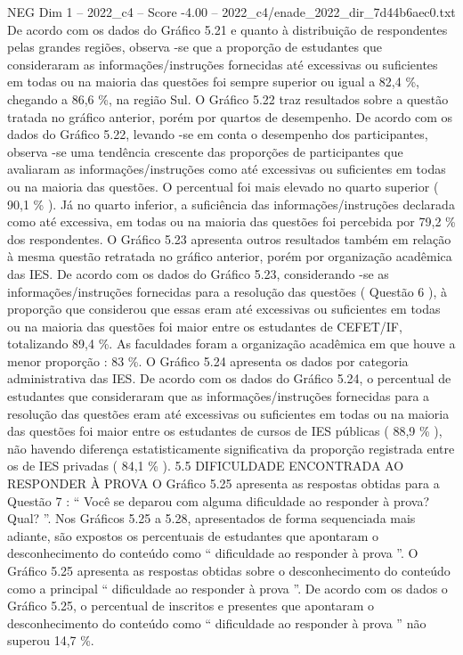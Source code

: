 \begin{textsample}{NEG Dim 1 – 2022\_c4 – Score -4.00 – 2022\_c4/enade\_2022\_dir\_7d44b6aec0.txt}
De acordo com os dados do Gráfico 5.21 e quanto à distribuição de respondentes pelas grandes regiões, observa -se que a proporção de estudantes que consideraram as informações/instruções fornecidas até excessivas ou suficientes em todas ou na maioria das questões foi sempre superior ou igual a 82,4 \%, chegando a 86,6 \%, na região Sul.
O Gráfico 5.22 traz resultados sobre a questão tratada no gráfico anterior, porém por quartos de desempenho.
De acordo com os dados do Gráfico 5.22, levando -se em conta o desempenho dos participantes, observa -se uma tendência crescente das proporções de participantes que avaliaram as informações/instruções como até excessivas ou suficientes em todas ou na maioria das questões.
O percentual foi mais elevado no quarto superior ( 90,1 \% ).
Já no quarto inferior, a suficiência das informações/instruções declarada como até excessiva, em todas ou na maioria das questões foi percebida por 79,2 \% dos respondentes.
O Gráfico 5.23 apresenta outros resultados também em relação à mesma questão retratada no gráfico anterior, porém por organização acadêmica das IES.
De acordo com os dados do Gráfico 5.23, considerando -se as informações/instruções fornecidas para a resolução das questões ( Questão 6 ), à proporção que considerou que essas eram até excessivas ou suficientes em todas ou na maioria das questões foi maior entre os estudantes de CEFET/IF, totalizando 89,4 \%.
As faculdades foram a organização acadêmica em que houve a menor proporção : 83 \%.
O Gráfico 5.24 apresenta os dados por categoria administrativa das IES.
De acordo com os dados do Gráfico 5.24, o percentual de estudantes que consideraram que as informações/instruções fornecidas para a resolução das questões eram até excessivas ou suficientes em todas ou na maioria das questões foi maior entre os estudantes de cursos de IES públicas ( 88,9 \% ), não havendo diferença estatisticamente significativa da proporção registrada entre os de IES privadas ( 84,1 \% ). 5.5 DIFICULDADE ENCONTRADA AO RESPONDER À PROVA O Gráfico 5.25 apresenta as respostas obtidas para a Questão 7 : “ Você se deparou com alguma dificuldade ao responder à prova?
Qual? ”.
Nos Gráficos 5.25 a 5.28, apresentados de forma sequenciada mais adiante, são expostos os percentuais de estudantes que apontaram o desconhecimento do conteúdo como “ dificuldade ao responder à prova ”.
O Gráfico 5.25 apresenta as respostas obtidas sobre o desconhecimento do conteúdo como a principal “ dificuldade ao responder à prova ”.
De acordo com os dados o Gráfico 5.25, o percentual de inscritos e presentes que apontaram o desconhecimento do conteúdo como “ dificuldade ao responder à prova ” não superou 14,7 \%.

\end{textsample}
